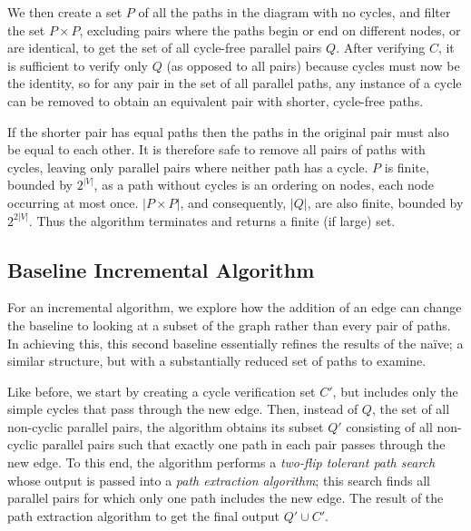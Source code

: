 \documentclass[sigplan,review,nonacm=true]{acmart}
\begin{document}
We then create a set $P$ of all the paths in the diagram with no cycles, and filter the set $P \times P$, excluding pairs where the paths begin or end on different nodes, or are identical, to get the set of all cycle-free parallel pairs $Q$.
After verifying $C$, it is sufficient to verify only $Q$ (as opposed to all pairs) because cycles must now be the identity, so for any pair in the set of all parallel paths, any instance of a cycle can be removed to obtain an equivalent pair with shorter, cycle-free paths.

If the shorter pair has equal paths then the paths in the original pair must also be equal to each other.
It is therefore safe to remove all pairs of paths with cycles, leaving only parallel pairs where neither path has a cycle.
$P$ is finite, bounded by $2^{|V|}$, as a path without cycles is an ordering on nodes, each node occurring at most once.
$|P \times P|$, and consequently, $|Q|$, are also finite, bounded by $2^{2|V|}$.
Thus the algorithm terminates and returns a finite (if large) set.

\subsection{Baseline Incremental Algorithm}

For an incremental algorithm, we explore how the addition of an edge can change the baseline to looking at a subset of the graph rather than every pair of paths.  In achieving this, this second baseline essentially refines the results of the na\"{i}ve; a similar structure, but with a substantially reduced set of paths to examine.

Like before, we start by creating a cycle verification set $C'$, but includes only the simple cycles that pass through the new edge.
Then, instead of $Q$, the set of all non-cyclic parallel pairs, the algorithm obtains its subset $Q'$ consisting of all non-cyclic parallel pairs such that exactly one path in each pair passes through the new edge.
To this end, the algorithm performs a \textit{two-flip tolerant path search} whose output is passed into a \textit{path extraction algorithm}; this search finds all parallel pairs for which only one path includes the new edge.
The result of the path extraction algorithm to get the final output $Q' \cup C'$.
\end{document}
